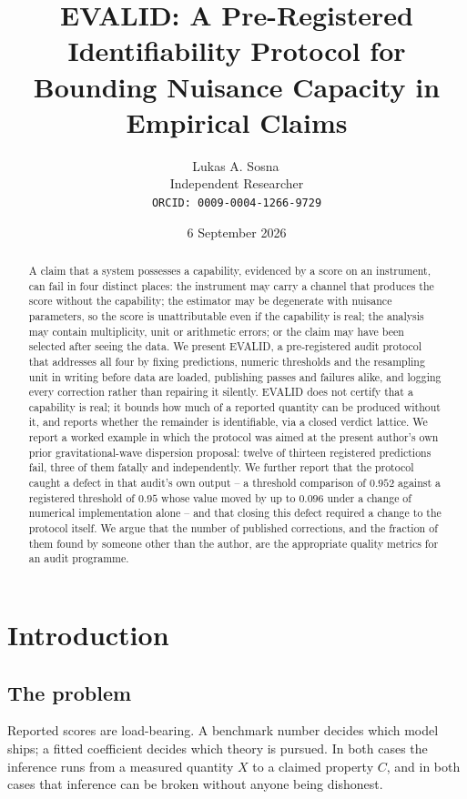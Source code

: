 \documentclass[11pt,a4paper]{article}
\title{EVALID: A Pre-Registered Identifiability Protocol for Bounding
Nuisance Capacity in Empirical Claims}
\author{Lukas A. Sosna\,\orcidlink{0009-0004-1266-9729}\\
\small Independent Researcher\\
\small \texttt{ORCID: 0009-0004-1266-9729}}
\date{6 September 2026}
\begin{document}
\maketitle

\begin{abstract}
A claim that a system possesses a capability, evidenced by a score on an
instrument, can fail in four distinct places: the instrument may carry a
channel that produces the score without the capability; the estimator may be
degenerate with nuisance parameters, so the score is unattributable even if the
capability is real; the analysis may contain multiplicity, unit or arithmetic
errors; or the claim may have been selected after seeing the data. We present
EVALID, a pre-registered audit protocol that addresses all four by fixing
predictions, numeric thresholds and the resampling unit in writing before data
are loaded, publishing passes and failures alike, and logging every correction
rather than repairing it silently. EVALID does not certify that a capability is
real; it bounds how much of a reported quantity can be produced without it, and
reports whether the remainder is identifiable, via a closed verdict lattice.
We report a worked example in which the protocol was aimed at the present
author's own prior gravitational-wave dispersion proposal: twelve of thirteen
registered predictions fail, three of them fatally and independently. We
further report that the protocol caught a defect in that audit's own output --
a threshold comparison of $0.952$ against a registered threshold of $0.95$
whose value moved by up to $0.096$ under a change of numerical implementation
alone -- and that closing this defect required a change to the protocol itself.
We argue that the number of published corrections, and the fraction of them
found by someone other than the author, are the appropriate quality metrics for
an audit programme.
\end{abstract}

\section{Introduction}
\label{sec:intro}

\subsection{The problem}

Reported scores are load-bearing. A benchmark number decides which model ships;
a fitted coefficient decides which theory is pursued. In both cases the
inference runs from a measured quantity $X$ to a claimed property $C$, and in
both cases that inference can be broken without anyone being dishonest.
\end{document}
